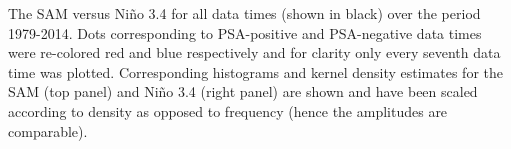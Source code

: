 \label{fig:sam_v_enso}
The SAM versus Ni\~{n}o 3.4 for all data times (shown in black) over the period 1979-2014. Dots corresponding to PSA-positive and PSA-negative data times were re-colored red and blue respectively and for clarity only every seventh data time was plotted. Corresponding histograms and kernel density estimates for the SAM (top panel) and Ni\~{n}o 3.4 (right panel) are shown and have been scaled according to density as opposed to frequency (hence the amplitudes are comparable).